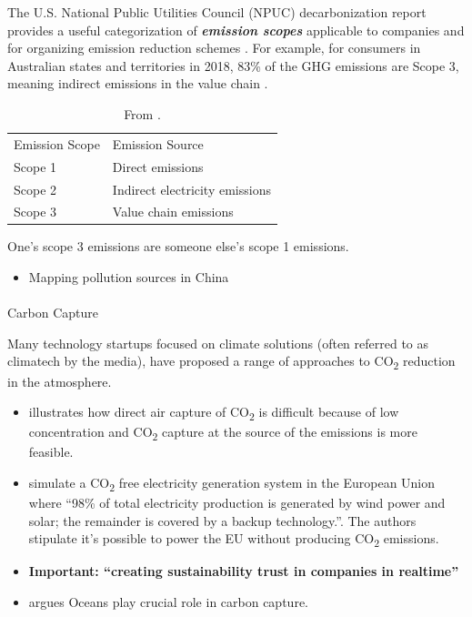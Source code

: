 \documentclass[
  letterpaper,
  DIV=11,
  numbers=noendperiod]{scrartcl}
\makeatletter
\let\oldparagraph\paragraph
\renewcommand{\paragraph}{
    \@ifstar
      \xxxParagraphStar
      \xxxParagraphNoStar
  }
\newcommand{\xxxParagraphStar}[1]{\oldparagraph*{#1}\mbox{}}
\newcommand{\xxxParagraphNoStar}[1]{\oldparagraph{#1}\mbox{}}
\providecommand{\tightlist}{%
  \setlength{\itemsep}{0pt}\setlength{\parskip}{0pt}}\usepackage{longtable,booktabs,array}
\makeatother
\begin{document}
The U.S. National Public Utilities Council (NPUC) decarbonization report
provides a useful categorization of \textbf{\emph{emission scopes}}
applicable to companies and for organizing emission reduction schemes
\citep{nationalpublicutilitiescouncilAnnualUtilityDecarbonization2022}.
For example, for consumers in Australian states and territories in 2018,
83\% of the GHG emissions are Scope 3, meaning indirect emissions in the
value chain \citet{goodwinTargetingDegreesGlobal2023}.

\begin{longtable}[]{@{}ll@{}}
\caption{From
\citet{nationalpublicutilitiescouncilAnnualUtilityDecarbonization2022}.}\tabularnewline
\toprule\noalign{}
\endfirsthead
\endhead
\bottomrule\noalign{}
\endlastfoot
Emission Scope & Emission Source \\
Scope 1 & Direct emissions \\
Scope 2 & Indirect electricity emissions \\
Scope 3 & Value chain emissions \\
\end{longtable}

One's scope 3 emissions are someone else's scope 1 emissions.

\begin{itemize}
\tightlist
\item
  Mapping pollution sources in China
  \citet{xieEcologicalCivilizationChina2021}
\end{itemize}

\paragraph{Carbon Capture}\label{carbon-capture}

Many technology startups focused on climate solutions (often referred to
as climatech by the media), have proposed a range of approaches to
CO\textsubscript{2} reduction in the atmosphere.

\begin{itemize}
\item
  \citet{vitilloRoleCarbonCapture2022} illustrates how direct air
  capture of CO\textsubscript{2} is difficult because of low
  concentration and CO\textsubscript{2} capture at the source of the
  emissions is more feasible.
\item
  \citet{gaureTrueNotTrue2022} simulate a CO\textsubscript{2} free
  electricity generation system in the European Union where ``98\% of
  total electricity production is generated by wind power and solar; the
  remainder is covered by a backup technology.''. The authors stipulate
  it's possible to power the EU without producing CO\textsubscript{2}
  emissions.
\item
  \textbf{Important: ``creating sustainability trust in companies in
  realtime''}
\item
  \citet{howardPotentialIntegrateBlue2017} argues Oceans play crucial
  role in carbon capture.
\end{itemize}
\end{document}
